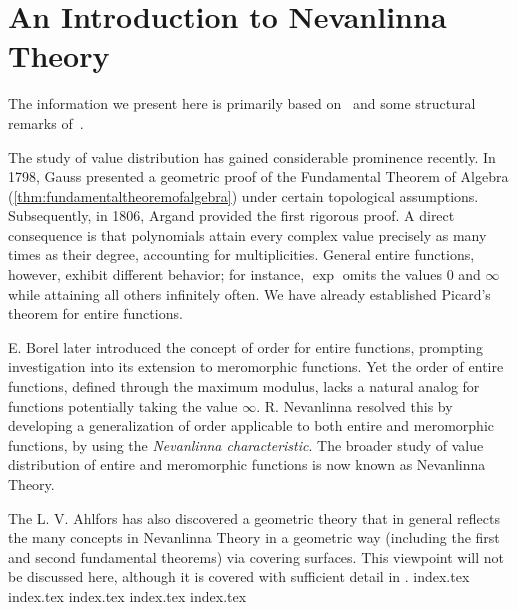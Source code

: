 \section{An Introduction to Nevanlinna Theory}\label{sec:nevanlinnatheory}
The information we present here is primarily based on~\cite{holland1973introduction} and some structural remarks of~\cite{charak2009meromorphicvaluedistribution}.

The study of value distribution has gained considerable prominence recently. In 1798, Gauss presented a geometric proof of the Fundamental Theorem of Algebra (\cref{thm:fundamentaltheoremofalgebra}) under certain topological assumptions. Subsequently, in 1806, Argand provided the first rigorous proof. A direct consequence is that polynomials attain every complex value precisely as many times as their degree, accounting for multiplicities. General entire functions, however, exhibit different behavior; for instance, \(\exp\) omits the values 0 and \(\infty\) while attaining all others infinitely often. We have already established Picard's theorem for entire functions.

E. Borel later introduced the concept of order for entire functions, prompting investigation into its extension to meromorphic functions. Yet the order of entire functions, defined through the maximum modulus, lacks a natural analog for functions potentially taking the value \(\infty\). R. Nevanlinna resolved this by developing a generalization of order applicable to both entire and meromorphic functions, by using the \textit{Nevanlinna characteristic}. The broader study of value distribution of entire and meromorphic functions is now known as Nevanlinna Theory.

The L. V. Ahlfors has also discovered a geometric theory that in general reflects the many concepts in Nevanlinna Theory in a geometric way (including the first and second fundamental theorems) via covering surfaces. This viewpoint will not be discussed here, although it is covered with sufficient detail in \cite{hayman1964meromorphic}.
{index.tex}
{index.tex}
{index.tex}
{index.tex}
{index.tex}
